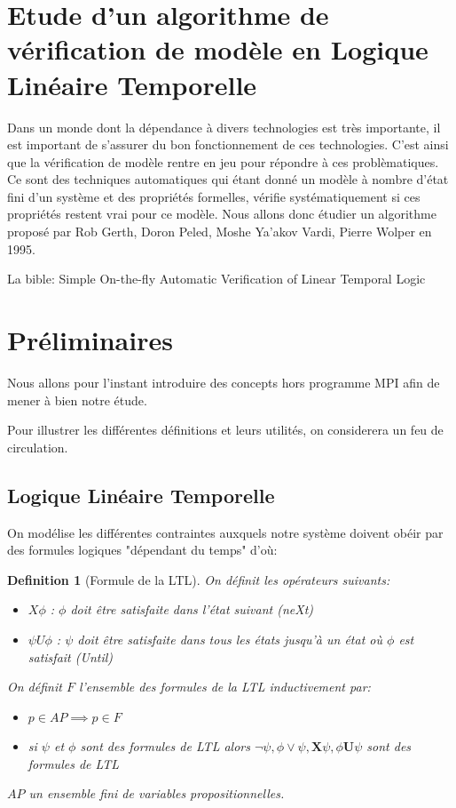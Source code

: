 \documentclass{paper}
\newtheorem{definition}{Definition}
\begin{document}
\setlength{\headheight}{13.07225pt}
\addtolength{\topmargin}{-1.07225pt}

\section*{Etude d'un algorithme de vérification de modèle en Logique Linéaire Temporelle}

Dans un monde dont la dépendance à divers technologies est très importante, il est important de s'assurer du bon fonctionnement de ces technologies.
C'est ainsi que la vérification de modèle rentre en jeu pour répondre à ces problèmatiques. Ce sont des techniques automatiques qui étant donné un 
modèle à nombre d'état fini d'un système et des propriétés formelles, vérifie systématiquement si ces propriétés restent vrai pour ce modèle.
Nous allons donc étudier un algorithme proposé par Rob Gerth, Doron Peled, Moshe Ya'akov Vardi, Pierre Wolper en 1995.

La bible: Simple On-the-fly Automatic Verification of Linear Temporal Logic

\section{Préliminaires}
    Nous allons pour l'instant introduire des concepts hors programme MPI afin de mener à bien notre étude.

    Pour illustrer les différentes définitions et leurs utilités, on considerera un feu de circulation.
\subsection{Logique Linéaire Temporelle}
    On modélise les différentes contraintes auxquels notre système doivent obéir par des formules logiques "dépendant du temps" d'où:
    \begin{definition}[Formule de la LTL]
        On définit les opérateurs suivants:
            \begin{itemize}
                \item $X\phi$ : $\phi$ doit être satisfaite dans l'état suivant (neXt)
                \item $\psi U\phi$ : $\psi$ doit être satisfaite dans tous les états jusqu'à un état où $\phi$ est satisfait (Until)
            \end{itemize}
        On définit $F$ l'ensemble des formules de la LTL inductivement par:
        \begin{itemize}
            \item $p\in AP \implies p\in F$
            \item si $\psi$ et $\phi$ sont des formules de LTL alors $\lnot\psi, \phi\lor\psi, \textbf{X}\psi, \phi \textbf{U}\psi$ sont des formules de LTL
        \end{itemize}
        $AP$ un ensemble fini de variables propositionnelles.
    \end{definition}
\end{document}
